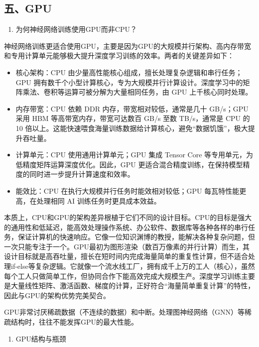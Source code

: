 \hypertarget{ux4e94gpu}{%
\subsection{五、GPU}\label{ux4e94gpu}}

\begin{enumerate}
\def\labelenumi{\arabic{enumi}.}
\tightlist
\item
  为何神经网络训练使用GPU而非CPU？
\end{enumerate}

神经网络训练更适合使用GPU，主要是因为GPU的大规模并行架构、高内存带宽和专用计算单元能够极大提升深度学习训练的效率。两者的关键差异如下：

\begin{itemize}
\tightlist
\item
  核心架构：CPU 由少量高性能核心组成，擅长处理复杂逻辑和串行任务；GPU 拥有数千个小型计算核心，专为大规模并行计算设计。深度学习中的矩阵乘法、卷积等运算可被分解为大量相同任务，由 GPU 上千核心同时处理。
\item
  内存带宽：CPU 依赖 DDR 内存，带宽相对较低，通常是几十 GB/s；GPU 采用 HBM 等高带宽内存，带宽可达数百 GB/s 至数 TB/s，通常是 CPU 的 10 倍以上。这能快速喂食海量训练数据给计算核心，避免``数据饥饿''，极大提升吞吐量。
\item
  计算单元：CPU 使用通用计算单元；GPU 集成 Tensor Core 等专用单元，为低精度矩阵运算深度优化。因此，GPU 更适合混合精度训练，在保持模型精度的同时进一步提升计算速度和效率。
\item
  能效比：CPU 在执行大规模并行任务时能效相对较低；GPU 每瓦特性能更高，在处理相同 AI 训练任务时更具成本效益。
\end{itemize}

本质上，CPU和GPU的架构差异根植于它们不同的设计目标。CPU的目标是强大的通用性和低延迟，能高效处理操作系统、办公软件、数据库等各种各样的串行任务，保证计算机的快速响应。它像一位知识渊博的教授，能解决各种复杂问题，但一次只能专注于一个。GPU最初为图形渲染（数百万像素的并行计算）而生，其设计目标就是高吞吐量，擅长在短时间内完成海量简单的重复性计算，但不适合处理if-else等复杂逻辑。它就像一个流水线工厂，拥有成千上万的工人（核心），虽然每个工人只做简单工作，但协同合作下能高效完成大规模生产。深度学习训练主要是大量线性矩阵、激活函数、梯度的计算，正好符合``海量简单重复计算''的特性，因此与GPU的架构优势完美契合。

GPU非常讨厌稀疏数据（不连续的数据）和中断。处理图神经网络（GNN）等稀疏结构时，往往不能发挥GPU的最大性能。

\begin{enumerate}
\def\labelenumi{\arabic{enumi}.}
\setcounter{enumi}{1}
\tightlist
\item
  GPU结构与瓶颈
\end{enumerate}

